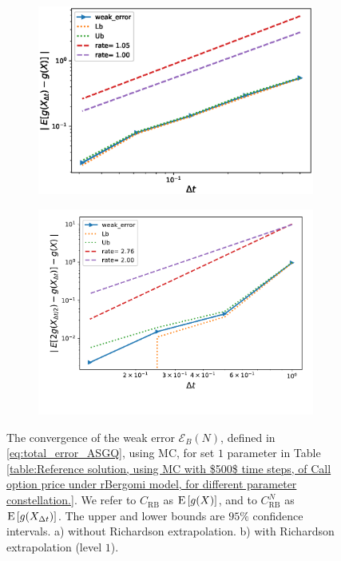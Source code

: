 \begin{figure}[h!]
	\centering
	\begin{subfigure}{.4\textwidth}
		\centering
		\includegraphics[width=1\linewidth]{./figures/rBergomi_weak_error_rates/without_richardson/H_007/weak_convergence_order_Bergomi_H_007_K_1_M_10_6_CI_relative}
		\caption{}
		\label{fig:sub3}
	\end{subfigure}%
	\begin{subfigure}{.4\textwidth}
		\centering
		\includegraphics[width=1\linewidth]{./figures/rBergomi_weak_error_rates/with_richardson/H_007/weak_convergence_order_Bergomi_H_007_K_1_richardson_relative_M_10_6}
		\caption{}
		\label{fig:sub4}
	\end{subfigure}
	
	\caption{The  convergence of the weak error $\mathcal{E}_B(N)$, defined in \eqref{eq:total_error_ASGQ}, using MC, for set $1$ parameter in Table \ref{table:Reference solution, using MC with $500$ time steps, of Call option price under rBergomi model, for different parameter constellation.}. We refer to $C_{\text{RB}}$ as $\mathrm{E}\left[g(X)\right]$, and to $C_{\text{RB}}^{N}$ as  $\mathrm{E}\left[g(X_{\Delta t})\right]$. The upper and lower bounds are $95\%$ confidence intervals. a) without Richardson extrapolation.  b) with Richardson extrapolation (level $1$).}
	\label{fig:Weak_rate_set1_set_2_without_rich}
\end{figure}
\FloatBarrier


